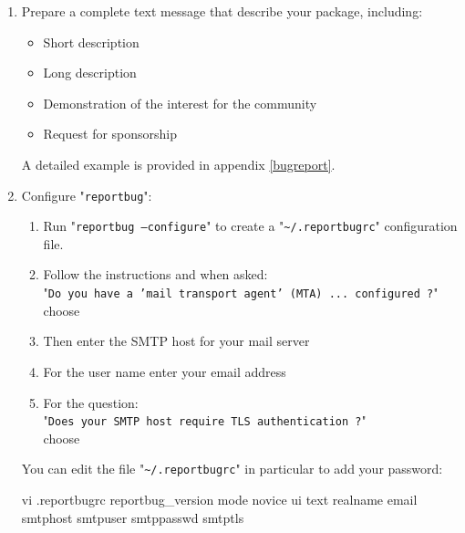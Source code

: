 \begin{enumerate}
\item Prepare a complete text message that describe your package, including:
\begin{itemize}
\item Short description
\item Long description
\item Demonstration of the interest for the community
\item Request for sponsorship
\end{itemize}
A detailed example is provided in appendix \ref{bugreport}. 
\item Configure "\texttt{reportbug}":
\begin{enumerate}
\item Run "\texttt{reportbug --configure}" to create a "\texttt{\textasciitilde/.reportbugrc}" configuration file.
\item Follow the instructions and when asked: \\
"\texttt{Do you have a 'mail transport agent' (MTA) ... configured ?}" \\
choose 
\item Then enter the SMTP host for your mail server
\item For the user name enter your email address
\item For the question: \\
"\texttt{Does your SMTP host require TLS authentication ?}" \\
choose 
\end{enumerate}
You can edit the file "\texttt{\textasciitilde/.reportbugrc}" in particular to add your password:
{\footnotesize{
\begin{scriptii}
\uprompt{~} vi .reportbugrc
reportbug\_version 
mode novice
ui text
realname 
email 
smtphost 
smtpuser 
smtppasswd 
smtptls

\end{scriptii}}}
\end{enumerate}
